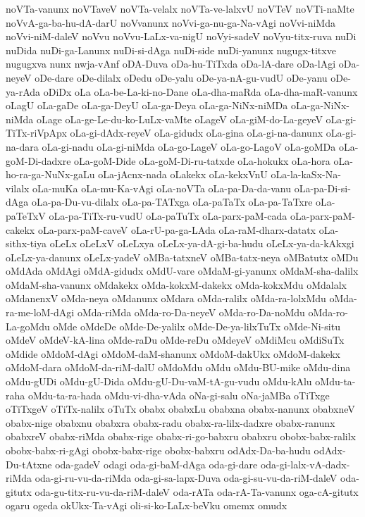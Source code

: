 {noVTa-vanunx
noVTaveV
noVTa-velalx
noVTa-ve-lalxvU
noVTeV
noVTi-naMte
noVvA-ga-ba-hu-dA-darU
noVvanunx
noVvi-ga-nu-ga-Na-vAgi
noVvi-niMda
noVvi-niM-daleV
noVvu
noVvu-LaLx-va-nigU
noVyi-sadeV
noVyu-titx-ruva
nuDi
nuDida
nuDi-ga-Lanunx
nuDi-si-dAga
nuDi-side
nuDi-yanunx
nugugx-titxve
nugugxva
nunx
nwja-vAnf
oDA-Duva
oDa-hu-TiTxda
oDa-lA-dare
oDa-lAgi
oDa-neyeV
oDe-dare
oDe-dilalx
oDedu
oDe-yalu
oDe-ya-nA-gu-vudU
oDe-yanu
oDe-ya-rAda
oDiDx
oLa
oLa-be-La-ki-no-Dane
oLa-dha-maRda
oLa-dha-maR-vanunx
oLagU
oLa-gaDe
oLa-ga-DeyU
oLa-ga-Deya
oLa-ga-NiNx-niMDa
oLa-ga-NiNx-niMda
oLage
oLa-ge-Le-du-ko-LuLx-vaMte
oLageV
oLa-giM-do-La-geyeV
oLa-gi-TiTx-riVpApx
oLa-gi-dAdx-reyeV
oLa-gidudx
oLa-gina
oLa-gi-na-danunx
oLa-gi-na-dara
oLa-gi-nadu
oLa-gi-niMda
oLa-go-LageV
oLa-go-LagoV
oLa-goMDa
oLa-goM-Di-dadxre
oLa-goM-Dide
oLa-goM-Di-ru-tatxde
oLa-hokukx
oLa-hora
oLa-ho-ra-ga-NuNx-gaLu
oLa-jAcnx-nada
oLakekx
oLa-kekxVnU
oLa-la-kaSx-Na-vilalx
oLa-muKa
oLa-mu-Ka-vAgi
oLa-noVTa
oLa-pa-Da-da-vanu
oLa-pa-Di-si-dAga
oLa-pa-Du-vu-dilalx
oLa-pa-TATxga
oLa-paTaTx
oLa-pa-TaTxre
oLa-paTeTxV
oLa-pa-TiTx-ru-vudU
oLa-paTuTx
oLa-parx-paM-cada
oLa-parx-paM-cakekx
oLa-parx-paM-caveV
oLa-rU-pa-ga-LAda
oLa-raM-dharx-datatx
oLa-sithx-tiya
oLeLx
oLeLxV
oLeLxya
oLeLx-ya-dA-gi-ba-hudu
oLeLx-ya-da-kAkxgi
oLeLx-ya-danunx
oLeLx-yadeV
oMBa-tatxneV
oMBa-tatx-neya
oMBatutx
oMDu
oMdAda
oMdAgi
oMdA-gidudx
oMdU-vare
oMdaM-gi-yanunx
oMdaM-sha-dalilx
oMdaM-sha-vanunx
oMdakekx
oMda-kokxM-dakekx
oMda-kokxMdu
oMdalalx
oMdanenxV
oMda-neya
oMdanunx
oMdara
oMda-ralilx
oMda-ra-lolxMdu
oMda-ra-me-loM-dAgi
oMda-riMda
oMda-ro-Da-neyeV
oMda-ro-Da-noMdu
oMda-ro-La-goMdu
oMde
oMdeDe
oMde-De-yalilx
oMde-De-ya-lilxTuTx
oMde-Ni-situ
oMdeV
oMdeV-kA-lina
oMde-raDu
oMde-reDu
oMdeyeV
oMdiMcu
oMdiSuTx
oMdide
oMdoM-dAgi
oMdoM-daM-shanunx
oMdoM-dakUkx
oMdoM-dakekx
oMdoM-dara
oMdoM-da-riM-dalU
oMdoMdu
oMdu
oMdu-BU-mike
oMdu-dina
oMdu-gUDi
oMdu-gU-Dida
oMdu-gU-Du-vaM-tA-gu-vudu
oMdu-kAlu
oMdu-ta-raha
oMdu-ta-ra-hada
oMdu-vi-dha-vAda
oNa-gi-salu
oNa-jaMBa
oTiTxge
oTiTxgeV
oTiTx-nalilx
oTuTx
obabx
obabxLu
obabxna
obabx-nanunx
obabxneV
obabx-nige
obabxnu
obabxra
obabx-radu
obabx-ra-lilx-dadxre
obabx-ranunx
obabxreV
obabx-riMda
obabx-rige
obabx-ri-go-babxru
obabxru
obobx-babx-ralilx
obobx-babx-ri-gAgi
obobx-babx-rige
obobx-babxru
odAdx-Da-ba-hudu
odAdx-Du-tAtxne
oda-gadeV
odagi
oda-gi-baM-dAga
oda-gi-dare
oda-gi-lalx-vA-dadx-riMda
oda-gi-ru-vu-da-riMda
oda-gi-sa-lapx-Duva
oda-gi-su-vu-da-riM-daleV
oda-gitutx
oda-gu-titx-ru-vu-da-riM-daleV
oda-rATa
oda-rA-Ta-vanunx
oga-cA-gitutx
ogaru
ogeda
okUkx-Ta-vAgi
oli-si-ko-LaLx-beVku
omemx
omudx
}
